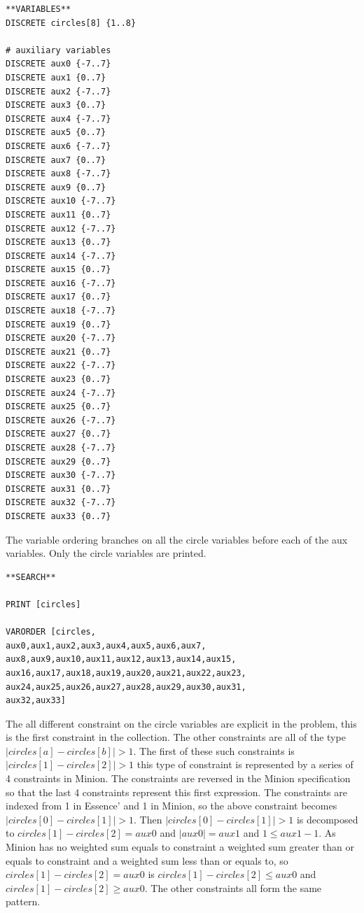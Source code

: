 \documentclass[oneside]{book}
\begin{document}
\begin{verbatim}
**VARIABLES**
DISCRETE circles[8] {1..8}

# auxiliary variables
DISCRETE aux0 {-7..7}
DISCRETE aux1 {0..7}
DISCRETE aux2 {-7..7}
DISCRETE aux3 {0..7}
DISCRETE aux4 {-7..7}
DISCRETE aux5 {0..7}
DISCRETE aux6 {-7..7}
DISCRETE aux7 {0..7}
DISCRETE aux8 {-7..7}
DISCRETE aux9 {0..7}
DISCRETE aux10 {-7..7}
DISCRETE aux11 {0..7}
DISCRETE aux12 {-7..7}
DISCRETE aux13 {0..7}
DISCRETE aux14 {-7..7}
DISCRETE aux15 {0..7}
DISCRETE aux16 {-7..7}
DISCRETE aux17 {0..7}
DISCRETE aux18 {-7..7}
DISCRETE aux19 {0..7}
DISCRETE aux20 {-7..7}
DISCRETE aux21 {0..7}
DISCRETE aux22 {-7..7}
DISCRETE aux23 {0..7}
DISCRETE aux24 {-7..7}
DISCRETE aux25 {0..7}
DISCRETE aux26 {-7..7}
DISCRETE aux27 {0..7}
DISCRETE aux28 {-7..7}
DISCRETE aux29 {0..7}
DISCRETE aux30 {-7..7}
DISCRETE aux31 {0..7}
DISCRETE aux32 {-7..7}
DISCRETE aux33 {0..7}
\end{verbatim}

The variable ordering branches on all the circle variables before each of the aux variables. Only the circle variables are printed.

\begin{verbatim}
**SEARCH**

PRINT [circles]

VARORDER [circles,
aux0,aux1,aux2,aux3,aux4,aux5,aux6,aux7,
aux8,aux9,aux10,aux11,aux12,aux13,aux14,aux15,
aux16,aux17,aux18,aux19,aux20,aux21,aux22,aux23,
aux24,aux25,aux26,aux27,aux28,aux29,aux30,aux31,
aux32,aux33]
\end{verbatim}

The all different constraint on the circle variables are explicit in the  problem, this is the first constraint in the collection. The other constraints are all of the type $|circles[a] - circles[b]| > 1$. The first of these such constraints is $|circles[1] - circles[2]| > 1$ this type of constraint is represented by a series of 4 constraints in Minion.   The constraints are reversed in the Minion specification so that the last 4 constraints represent this first expression. The constraints are indexed from 1 in Essence' and 1 in Minion, so the above constraint becomes $|circles[0] - circles[1]| > 1$. Then $|circles[0] - circles[1]| > 1$ is decomposed to $circles[1] - circles[2] = aux0$ and $|aux0| = aux1$ and $1 \leq aux1-1$.  As Minion has no weighted sum equals to constraint a weighted sum greater than or equals to constraint and a weighted sum less than or equals to, so $circles[1] - circles[2] = aux0$ is $circles[1] - circles[2] \leq aux0$ and $circles[1] - circles[2] \geq aux0$. The other constraints all form the same pattern.
\end{document}
